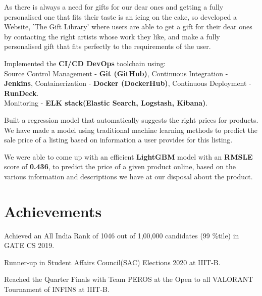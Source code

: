 \documentclass[]{deedy-resume-openfont}
\begin{document}
\begin{minipage}[t]{0.66\textwidth}
\begin{tightemize}
\item As there is always a need for gifts for our dear ones and getting a fully personalised one that fits their taste is an icing on the cake, so developed a Website, 'The Gift Library' where users are able to get a gift for their dear ones by contacting the right artists whose work they like, and make a fully personalised gift that fits perfectly to the requirements of the user.
\item Implemented the \textbf{CI/CD DevOps} toolchain using: \\
Source Control Management - \textbf{Git (GitHub)}, 
Continuous Integration - \textbf{Jenkins}, 
Containerization - \textbf{Docker (DockerHub)},
Continuous Deployment - \textbf{RunDeck}.\\
Monitoring - \textbf{ELK stack(Elastic Search, Logstash, Kibana)}.
\end{tightemize}
\sectionsep


\begin{tightemize}
\item Built a regression model that automatically suggests the right prices for products. We have made a model using traditional machine learning methods to predict the sale price of a listing based on information a user provides for this listing.
\item We  were  able  to  come up  with  an  efficient \textbf{LightGBM} model  with an  \textbf{RMSLE} score of \textbf{0.436}, to predict the price of a given product online, based on the various information and descriptions we have at our disposal about the product.
\end{tightemize}
\sectionsep







\section{Achievements} 
\vspace{\topsep}    %
\begin{tightemize}
\item Achieved an All India Rank of 1046 out of 1,00,000 candidates (99 \%tile) in 
GATE CS 2019.
\item Runner-up in Student Affairs Council(SAC) Elections 2020 at IIIT-B.
\item Reached the Quarter Finals with Team PEROS at the Open to all VALORANT Tournament of INFIN8 at IIIT-B.
\end{tightemize}


\end{minipage}
\end{document}

